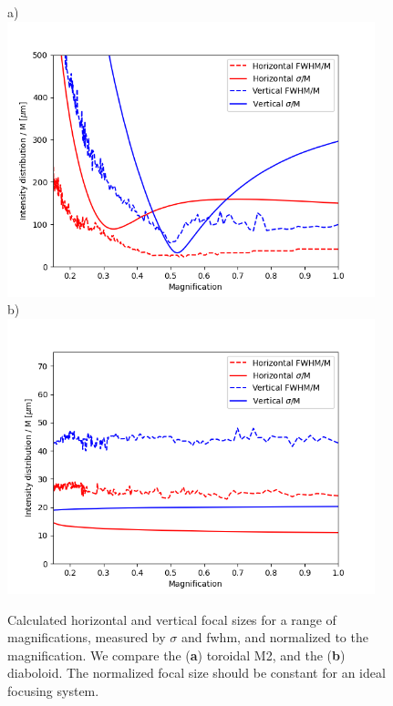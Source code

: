 \documentclass{iucr}       %
\begin{document}
\begin{figure}\label{fig:scan}
\flushleft
a)\\
\centering
\includegraphics[width=0.95\textwidth]{figures/scan_toroid.png}\\
\flushleft
b)\\
\centering
\includegraphics[width=0.95\textwidth]{figures/scan_diaboloid.png}\\
\caption{Calculated horizontal and vertical focal sizes for a range of magnifications, measured by $\sigma$ and fwhm, and normalized to the magnification. We compare the (\textbf{a}) toroidal M2, and the (\textbf{b}) diaboloid. The normalized focal size should be constant for an ideal focusing system.}
\end{figure}
\end{document}
